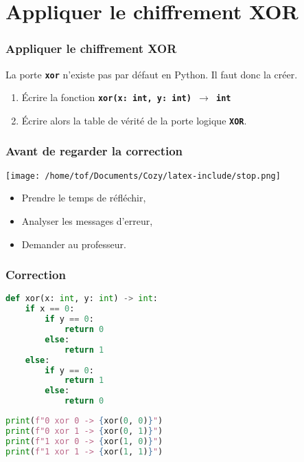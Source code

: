 \documentclass[svgnames,11pt]{beamer}
\begin{document}
\section{Appliquer le chiffrement XOR}
\begin{frame}
    \frametitle{Appliquer le chiffrement XOR}

La porte \textbf{\texttt{xor}} n'existe pas par défaut en Python. Il faut donc la créer.
\begin{activite}
\begin{enumerate}
    \item Écrire la fonction \textbf{\texttt{xor(x: int, y: int) $\rightarrow$ int}}
    \item Écrire alors la table de vérité de la porte logique \textbf{\texttt{XOR}}.
\end{enumerate}
\end{activite}

\end{frame}
\begin{frame}
    \frametitle{Avant de regarder la correction}
\begin{center}
    \centering
    \texttt{[image: /home/tof/Documents/Cozy/latex-include/stop.png]}
    \end{center}
{\Large
    \begin{itemize}
        \item Prendre le temps de réfléchir,
        \item Analyser les messages d'erreur,
        \item Demander au professeur.
    \end{itemize}
}
\end{frame}
\begin{frame}[fragile]
    \frametitle{Correction}
\begin{center}
\begin{lstlisting}[language=Python , basicstyle=\ttfamily\small, xleftmargin=2em, xrightmargin=2em]
def xor(x: int, y: int) -> int:
    if x == 0:
        if y == 0:
            return 0
        else:
            return 1
    else:
        if y == 0:
            return 1
        else:
            return 0
\end{lstlisting}
\begin{lstlisting}[language=Python , basicstyle=\ttfamily\small, xleftmargin=2em, xrightmargin=2em]
print(f"0 xor 0 -> {xor(0, 0)}")
print(f"0 xor 1 -> {xor(0, 1)}")
print(f"1 xor 0 -> {xor(1, 0)}")
print(f"1 xor 1 -> {xor(1, 1)}")
\end{lstlisting}
\end{center}
    

\end{frame}
\end{document}
